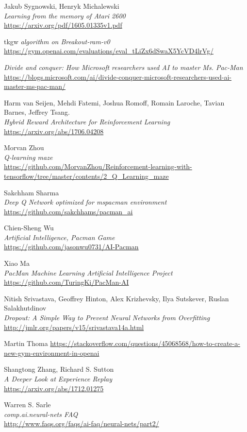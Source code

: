 \begin{thebibliography}{9}
Jakub Sygnowski, Henryk Michalewski \\
\textit{Learning from the memory of Atari 2600} \\
\url{https://arxiv.org/pdf/1605.01335v1.pdf} 

tkgw
\textit{algorithm on Breakout-ram-v0}
\url{https://gym.openai.com/evaluations/eval_tLiZx6dSwaX5YcVD4lrVg/}

\textit{Divide and conquer: How Microsoft researchers used AI to master Ms. Pac-Man} \newline
\url{https://blogs.microsoft.com/ai/divide-conquer-microsoft-researchers-used-ai-master-ms-pac-man/}

Harm van Seijen, Mehdi Fatemi, Joshua Romoff, Romain Laroche, Tavian Barnes, Jeffrey Tsang. \\
\textit{Hybrid Reward Architecture for Reinforcement Learning} \\
\url{https://arxiv.org/abs/1706.04208}

Morvan Zhou \\
\textit{Q-learning maze} \\
\url{https://github.com/MorvanZhou/Reinforcement-learning-with-tensorflow/tree/master/contents/2_Q_Learning_maze}

Sakchham Sharma \\
\textit{Deep Q Network optimized for mspacman environment} \\
\url{https://github.com/sakchhams/pacman_ai}

Chien-Sheng Wu \\
\textit{Artificial Intelligence, Pacman Game} \\
\url{https://github.com/jasonwu0731/AI-Pacman}

Xiao Ma \\
\textit{PacMan Machine Learning Artificial Intelligence Project} \\
\url{https://github.com/TuringKi/PacMan-AI}

Nitish Srivastava, Geoffrey Hinton, Alex Krizhevsky, Ilya Sutskever, Ruslan Salakhutdinov \\
\textit{Dropout: A Simple Way to Prevent Neural Networks from Overfitting} \\
\url{http://jmlr.org/papers/v15/srivastava14a.html}

Martin Thoma
\url{https://stackoverflow.com/questions/45068568/how-to-create-a-new-gym-environment-in-openai}

Shangtong Zhang, Richard S. Sutton \\
\textit{A Deeper Look at Experience Replay} \\
\url{https://arxiv.org/abs/1712.01275}

Warren S. Sarle \\
\textit{comp.ai.neural-nets FAQ} \\
\url{http://www.faqs.org/faqs/ai-faq/neural-nets/part2/}


\end{thebibliography}